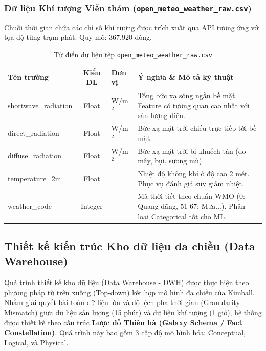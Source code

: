 \documentclass[12pt,a4paper]{article}
\begin{document}
\subsubsection{Dữ liệu Khí tượng Viễn thám (\texttt{open\_meteo\_weather\_raw.csv})}
Chuỗi thời gian chứa các chỉ số khí tượng được trích xuất qua API tương ứng với tọa độ từng trạm phát. Quy mô: 367.920 dòng.
\begin{table}[H]
\centering
\caption{Từ điển dữ liệu tệp \texttt{open\_meteo\_weather\_raw.csv}}
\renewcommand{\arraystretch}{1.4}
\begin{tabularx}{\textwidth}{p{3.8cm} c p{2cm} X}
\toprule
\textbf{Tên trường} & \textbf{Kiểu DL} & \textbf{Đơn vị} & \textbf{Ý nghĩa \& Mô tả kỹ thuật} \\
\midrule
shortwave\_radiation & Float   & W/m$^2$ & Tổng bức xạ sóng ngắn bề mặt. Feature có tương quan cao nhất với sản lượng điện. \\
direct\_radiation    & Float   & W/m$^2$ & Bức xạ mặt trời chiếu trực tiếp tới bề mặt. \\
diffuse\_radiation   & Float   & W/m$^2$ & Bức xạ mặt trời bị khuếch tán (do mây, bụi, sương mù). \\
temperature\_2m      & Float   & $^\circ$ & Nhiệt độ không khí ở độ cao 2 mét. Phục vụ đánh giá suy giảm nhiệt. \\
weather\_code        & Integer & -       & Mã thời tiết theo chuẩn WMO (0: Quang đãng, 51-67: Mưa...). Phân loại Categorical tốt cho ML. \\
\bottomrule
\end{tabularx}
\end{table}
\subsection{Thiết kế kiến trúc Kho dữ liệu đa chiều (Data Warehouse)}
\label{sec:star_schema}

Quá trình thiết kế kho dữ liệu (Data Warehouse - DWH) được thực hiện theo phương pháp từ trên xuống (Top-down) kết hợp mô hình đa chiều của Kimball. Nhằm giải quyết bài toán dữ liệu lớn và độ lệch pha thời gian (Granularity Mismatch) giữa dữ liệu sản lượng (15 phút) và dữ liệu khí tượng (1 giờ), hệ thống được thiết kế theo cấu trúc \textbf{Lược đồ Thiên hà (Galaxy Schema / Fact Constellation)}. Quá trình này bao gồm 3 cấp độ mô hình hóa: Conceptual, Logical, và Physical.
\end{document}
